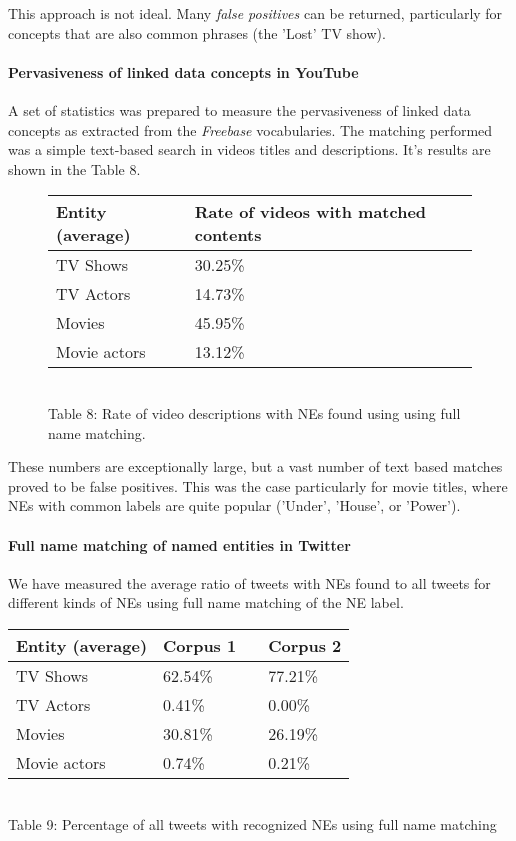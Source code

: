 This approach is not ideal. Many \textit{false positives} can be returned, particularly
for concepts that are also common phrases (\eg the 'Lost' TV show).

\paragraph{Pervasiveness of linked data concepts in YouTube}
A set of statistics was prepared to measure the pervasiveness of linked data
concepts as extracted from the \textit{Freebase} vocabularies. The matching performed
was a simple text-based search in videos titles and descriptions. It's results
are shown in the Table 8.

\begin{figure}[h!]
  \begin{center}
    \begin{tabular}{ | p{4cm} | p{6cm} | } \hline
      Entity (average) & Rate of videos with matched contents \\ \hline
      TV Shows & 30.25\% \\ \hline
      TV Actors & 14.73\% \\ \hline
      Movies & 45.95\% \\ \hline
      Movie actors & 13.12\% \\ \hline
    \end{tabular} \\
    Table 8: Rate of video descriptions with NEs found using using full name matching. \\
  \end{center}
\end{figure}

These numbers are exceptionally large, but a vast number of text
based matches proved to be false positives. This was the case particularly for
movie titles, where NEs with common labels are quite popular (\eg 'Under',
'House', or 'Power').

\paragraph{Full name matching of named entities in Twitter}
We have measured the average ratio of tweets with NEs found to all tweets for different kinds of NEs
using full name matching of the NE label.

\begin{center}
  \begin{tabular}{ | p{4cm} | p{2cm} | p{1cm}| p{2cm} | } \hline
    Entity (average) & Corpus 1 & & Corpus 2 \\ \hline
    TV Shows & 62.54\% & & 77.21\% \\ \hline
    TV Actors & 0.41\% & & 0.00\% \\ \hline
    Movies & 30.81\% & & 26.19\% \\ \hline
    Movie actors & 0.74\% & & 0.21\% \\ \hline
  \end{tabular} \\
  Table 9: Percentage of all tweets with recognized NEs using full name matching \\
\end{center}

